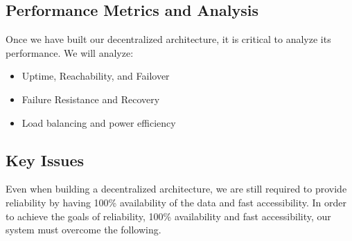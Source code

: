 %
%
\subsection{Performance Metrics and Analysis}
Once we have built our decentralized architecture, it is critical to analyze its performance.
We will analyze:
\begin{itemize}
 \item Uptime, Reachability, and Failover
 \item Failure Resistance and Recovery
 \item Load balancing and power efficiency
\end{itemize}

\subsection{Key Issues}
Even when building a decentralized architecture, we are still required to provide reliability by having 100\% availability of the data and fast accessibility. 
In order to achieve the goals of reliability, 100\% availability and fast accessibility, our system must overcome the following.

